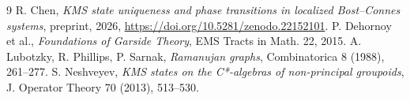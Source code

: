 \documentclass[11pt]{amsart}
\theoremstyle{remark}
\begin{document}
\begin{thebibliography}{9}
 R. Chen, \emph{KMS state uniqueness and phase transitions in localized Bost--Connes systems}, preprint, 2026, \newline\url{https://doi.org/10.5281/zenodo.22152101}.
 P. Dehornoy et al., \emph{Foundations of Garside Theory}, EMS Tracts in Math. 22, 2015.
 A. Lubotzky, R. Phillips, P. Sarnak, \emph{Ramanujan graphs}, Combinatorica 8 (1988), 261--277.
 S. Neshveyev, \emph{KMS states on the C*-algebras of non-principal groupoids}, J. Operator Theory 70 (2013), 513--530.
\end{thebibliography}
\end{document}
